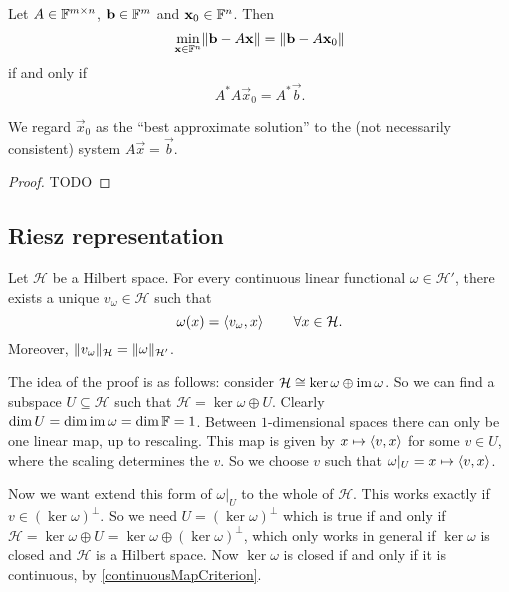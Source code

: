 \begin{proposition}
Let $A\in\mathbb{F}^{m\times n}$, $\boldsymbol{\mathrm{b}}\in\mathbb{F}^m$ and $\boldsymbol{\mathrm{x}}_0\in\mathbb{F}^n$. Then
\[ \min_{\boldsymbol{\mathrm{x}}\in\mathbb{F}^n}\lVert\boldsymbol{\mathrm{b}}-A \boldsymbol{\mathrm{x}}\rVert = \lVert\boldsymbol{\mathrm{b}} - A \boldsymbol{\mathrm{x}}_0\rVert \]
if and only if
\[ A^*A \vec{x}_0 = A^* \vec{b}. \]
\end{proposition}
We regard $\vec{x}_0$ as the ``best approximate solution'' to the (not necessarily consistent) system $A \vec{x} = \vec{b}$.
\begin{proof}
TODO
\end{proof}

\subsection{Riesz representation}
\begin{theorem} \label{rieszRepresentation}
Let $\mathcal{H}$ be a Hilbert space. For every continuous linear functional $\omega\in \mathcal{H}'$, there exists a unique $v_\omega\in\mathcal{H}$ such that
\[ \omega(x) = \left\langle v_\omega, x \right\rangle \qquad \forall x\in\mathcal{H}. \]
Moreover, $\lVert v_\omega\rVert_\mathcal{H} = \lVert\omega\rVert_{\mathcal{H}'}$.
\end{theorem}  

The idea of the proof is as follows: consider $\mathcal{H} \cong \ker\omega \oplus \operatorname{im}\omega$. So we can find a subspace $U\subseteq \mathcal{H}$ such that $\mathcal{H} = \ker\omega\oplus U$. Clearly $\dim U = \dim\operatorname{im}\omega = \dim\mathbb{F} = 1$. Between $1$-dimensional spaces there can only be one linear map, up to rescaling. This map is given by $x\mapsto \left\langle v,x \right\rangle$ for some $v\in U$, where the scaling determines the $v$. So we choose $v$ such that $\omega|_U = x\mapsto \left\langle v,x \right\rangle$.

Now we want extend this form of $\omega|_U$ to the whole of $\mathcal{H}$. This works exactly if $v\in(\ker\omega)^\perp$. So we need $U=(\ker\omega)^\perp$ which is true if and only if $\mathcal{H} = \ker\omega\oplus U = \ker\omega\oplus (\ker\omega)^\perp$, which only works in general if $\ker\omega$ is closed and $\mathcal{H}$ is a Hilbert space. Now $\ker\omega$ is closed if and only if it is continuous, by \ref{continuousMapCriterion}.

